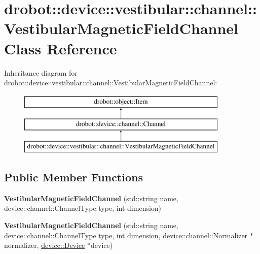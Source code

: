 \hypertarget{classdrobot_1_1device_1_1vestibular_1_1channel_1_1VestibularMagneticFieldChannel}{\section{drobot\-:\-:device\-:\-:vestibular\-:\-:channel\-:\-:Vestibular\-Magnetic\-Field\-Channel Class Reference}
\label{classdrobot_1_1device_1_1vestibular_1_1channel_1_1VestibularMagneticFieldChannel}
}
Inheritance diagram for drobot\-:\-:device\-:\-:vestibular\-:\-:channel\-:\-:Vestibular\-Magnetic\-Field\-Channel\-:\begin{figure}[H]
\begin{center}
\leavevmode
\includegraphics[height=3.000000cm]{classdrobot_1_1device_1_1vestibular_1_1channel_1_1VestibularMagneticFieldChannel}
\end{center}
\end{figure}
\subsection*{Public Member Functions}
\begin{DoxyCompactItemize}
\item 
\hypertarget{classdrobot_1_1device_1_1vestibular_1_1channel_1_1VestibularMagneticFieldChannel_a61360c39043963f43a8a6330a5a18864}{{\bfseries Vestibular\-Magnetic\-Field\-Channel} (std\-::string name, device\-::channel\-::\-Channel\-Type type, int dimension)}\label{classdrobot_1_1device_1_1vestibular_1_1channel_1_1VestibularMagneticFieldChannel_a61360c39043963f43a8a6330a5a18864}

\item 
\hypertarget{classdrobot_1_1device_1_1vestibular_1_1channel_1_1VestibularMagneticFieldChannel_a240a0375690f8a47e056df0877111927}{{\bfseries Vestibular\-Magnetic\-Field\-Channel} (std\-::string name, device\-::channel\-::\-Channel\-Type type, int dimension, \hyperlink{classdrobot_1_1device_1_1channel_1_1Normalizer}{device\-::channel\-::\-Normalizer} $\ast$normalizer, \hyperlink{classdrobot_1_1device_1_1Device}{device\-::\-Device} $\ast$device)}\label{classdrobot_1_1device_1_1vestibular_1_1channel_1_1VestibularMagneticFieldChannel_a240a0375690f8a47e056df0877111927}

\end{DoxyCompactItemize}
